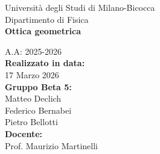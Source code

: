 \documentclass[a4paper,12pt]{article}
\begin{document}
\begin{titlepage}
    \begin{center}
        \vspace*{1cm}
        \Large{Università degli Studi di Milano-Bicocca}\\
        \Large{Dipartimento di Fisica }\\
        \vspace{1cm}
        \Huge{\textbf{Ottica geometrica}}
        
        \vspace{1.5cm}
        \large{A.A: 2025-2026}\\
        \vspace{2cm}
        \large{\textbf{Realizzato in data:}}\\
        \large{17 Marzo 2026}\\
        \vspace{1cm}
        \large{\textbf{Gruppo Beta 5:}}\\
        \large{Matteo Declich}\\
        \large{Federico Bernabei}\\
        \large{Pietro Bellotti}\\
        \vspace{1cm}
        \large{\textbf{Docente:}}\\
        \large{Prof. Maurizio Martinelli}\\
        \vfill
        \vspace{0.8cm}
    \end{center}
\end{titlepage}

\tableofcontents 
\newpage








\nocite{calvi2025}
\printbibliography[heading=bibintoc]
\end{document}
